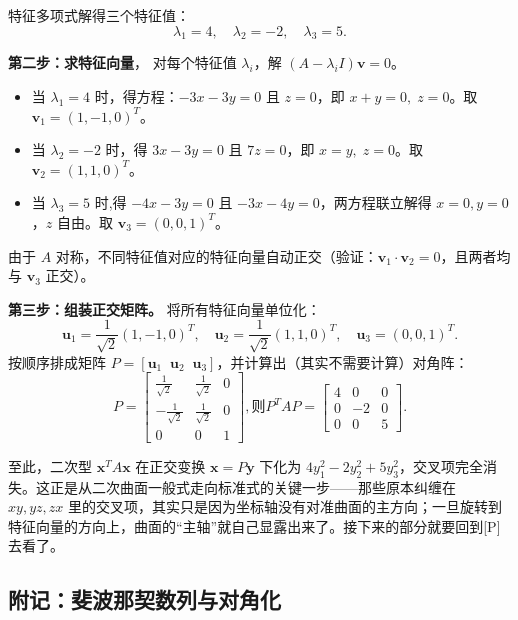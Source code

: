\documentclass[UTF8]{ctexbook}
\begin{document}
特征多项式解得三个特征值：
\[
\lambda_1 = 4,\quad \lambda_2 = -2,\quad \lambda_3 = 5.
\]

\textbf{第二步：求特征向量}， 对每个特征值 $\lambda_i$，解 $(A - \lambda_i I)\mathbf{v}=0$。

\begin{itemize}


  \item 当 $\lambda_1=4$ 时，得方程：$-3x-3y=0$ 且 $z=0$，即 $x+y=0,\;z=0$。取 $\mathbf{v}_1 = (1,-1,0)^T$。
  \item 当 $\lambda_2=-2$ 时，得 $3x-3y=0$ 且 $7z=0$，即 $x=y,\;z=0$。取 $\mathbf{v}_2 = (1,1,0)^T$。
  \item 当 $\lambda_3=5$ 时,得 $-4x-3y=0$ 且 $-3x-4y=0$，两方程联立解得 $x=0,y=0$，$z$ 自由。取 $\mathbf{v}_3 = (0,0,1)^T$。
\end{itemize}
由于 $A$ 对称，不同特征值对应的特征向量自动正交（验证：$\mathbf{v}_1\cdot\mathbf{v}_2=0$，且两者均与 $\mathbf{v}_3$ 正交）。

\textbf{第三步：组装正交矩阵。} 将所有特征向量单位化：
\[
\mathbf{u}_1 = \frac{1}{\sqrt{2}}(1,-1,0)^T,\quad 
\mathbf{u}_2 = \frac{1}{\sqrt{2}}(1,1,0)^T,\quad 
\mathbf{u}_3 = (0,0,1)^T.
\]
按顺序排成矩阵 $P = [\mathbf{u}_1 \;\; \mathbf{u}_2 \;\; \mathbf{u}_3]$，并计算出（其实不需要计算）对角阵：
\[
P = \begin{bmatrix}
\frac{1}{\sqrt{2}} & \frac{1}{\sqrt{2}} & 0 \\[2mm]
-\frac{1}{\sqrt{2}} & \frac{1}{\sqrt{2}} & 0 \\[2mm]
0 & 0 & 1
\end{bmatrix},
\text{则}
P^TAP = \begin{bmatrix}
4 & 0 & 0 \\
0 & -2 & 0 \\
0 & 0 & 5
\end{bmatrix}.
\]

至此，二次型 $\mathbf{x}^TA\mathbf{x}$ 在正交变换 $\mathbf{x}=P\mathbf{y}$ 下化为 $4y_1^2 -2y_2^2 + 5y_3^2$，交叉项完全消失。这正是从二次曲面一般式走向标准式的关键一步——那些原本纠缠在 $xy, yz, zx$ 里的交叉项，其实只是因为坐标轴没有对准曲面的主方向；一旦旋转到特征向量的方向上，曲面的“主轴”就自己显露出来了。接下来的部分就要回到[P\pageref{quadratic}]去看了。




\subsection{附记：斐波那契数列与对角化}
\end{document}
